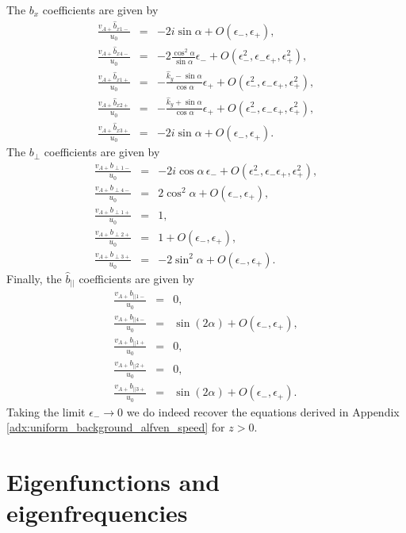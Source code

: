 \documentclass[linenumbers]{aastex63}
\begin{document}
The $b_x$ coefficients are given by
\begin{eqnarray}
    \frac{v_{A+}\hat{b}_{x1-}}{u_0} & = & -2i\sin\alpha + O(\epsilon_-,\epsilon_+), \\
    \frac{v_{A+}\hat{b}_{x4-}}{u_0} & = & -2\frac{\cos^2\alpha}{\sin\alpha}\epsilon_- + O(\epsilon_-^2,\epsilon_-\epsilon_+,\epsilon_+^2), \\
    \frac{v_{A+}\hat{b}_{x1+}}{u_0} & = & -\frac{\hat{k}_y - \sin\alpha}{\cos\alpha}\epsilon_+ + O(\epsilon_-^2,\epsilon_-\epsilon_+,\epsilon_+^2), \\
    \frac{v_{A+}\hat{b}_{x2+}}{u_0} & = & -\frac{\hat{k}_y+\sin\alpha}{\cos\alpha}\epsilon_+ + O(\epsilon_-^2,\epsilon_-\epsilon_+,\epsilon_+^2), \\
    \frac{v_{A+}\hat{b}_{x3+}}{u_0} & = & -2i\sin\alpha+O(\epsilon_-,\epsilon_+).
\end{eqnarray}
The $b_\perp$ coefficients are given by
\begin{eqnarray}
    \frac{v_{A+}b_{\perp1-}}{u_0} & = & -2i\cos\alpha\,\epsilon_- + O(\epsilon_-^2,\epsilon_-\epsilon_+,\epsilon_+^2), \\
    \frac{v_{A+}b_{\perp4-}}{u_0} & = & 2\cos^2\alpha + O(\epsilon_-,\epsilon_+), \\
    \frac{v_{A+}b_{\perp1+}}{u_0} & = & 1, \\
    \frac{v_{A+}b_{\perp2+}}{u_0} & = & 1 + O(\epsilon_-,\epsilon_+), \\
    \frac{v_{A+}b_{\perp3+}}{u_0} & = & -2\sin^2\alpha + O(\epsilon_-, \epsilon_+).
\end{eqnarray}
Finally,  the $\hat{b}_{||}$ coefficients are given by
\begin{eqnarray}
    \frac{v_{A+}b_{||1-}}{u_0} & = & 0, \\
    \frac{v_{A+}b_{||4-}}{u_0} & = & \sin(2\alpha) + O(\epsilon_-,\epsilon_+), \\
    \frac{v_{A+}b_{||1+}}{u_0} & = & 0, \\
    \frac{v_{A+}b_{||2+}}{u_0} & = & 0, \\
    \frac{v_{A+}b_{||3+}}{u_0} & = & \sin(2\alpha) + O(\epsilon_-, \epsilon_+).
\end{eqnarray}
Taking the limit $\epsilon_-\rightarrow0$ we do indeed recover the equations derived in Appendix \ref{adx:uniform_background_alfven_speed} for $z>0$.

\section{Eigenfunctions and eigenfrequencies}
\label{adx:eigenfunctions_and_eigenfrequencies}
\end{document}
